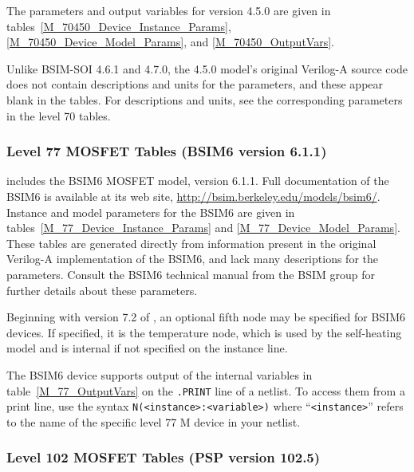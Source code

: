 The parameters and output variables for version 4.5.0 are given in
tables~\ref{M_70450_Device_Instance_Params},
\ref{M_70450_Device_Model_Params}, and 
\ref{M_70450_OutputVars}.

Unlike BSIM-SOI 4.6.1 and 4.7.0, the 4.5.0 model's original Verilog-A source
code does not contain descriptions and units for the parameters, and
these appear blank in the tables.  For descriptions and units, see the
corresponding parameters in the level 70 tables.











\clearpage
\subsubsection{Level 77 MOSFET Tables (BSIM6 version 6.1.1)}
\Xyce{} includes the BSIM6 MOSFET model, version 6.1.1.  Full
documentation of the BSIM6 is available at its web site,
\url{http://bsim.berkeley.edu/models/bsim6/}.  Instance and model
parameters for the BSIM6 are given in
tables~\ref{M_77_Device_Instance_Params} and
\ref{M_77_Device_Model_Params}.  These tables are generated directly
from information present in the original Verilog-A implementation of
the BSIM6, and lack many descriptions for the parameters.  Consult the
BSIM6 technical manual from the BSIM group for further details about
these parameters.

Beginning with version 7.2 of \Xyce{}, an optional fifth node may be
specified for BSIM6 devices.  If specified, it is the temperature
node, which is used by the self-heating model and is internal if not
specified on the instance line.

The BSIM6 device supports output of the internal variables in
table~\ref{M_77_OutputVars} on the \texttt{.PRINT} line of a netlist.
To access them from a print line, use the syntax
\texttt{N(<instance>:<variable>)} where ``\texttt{<instance>}'' refers to the
name of the specific level 77 M device in your netlist.





\clearpage
\subsubsection{Level 102 MOSFET Tables (PSP version 102.5)}

